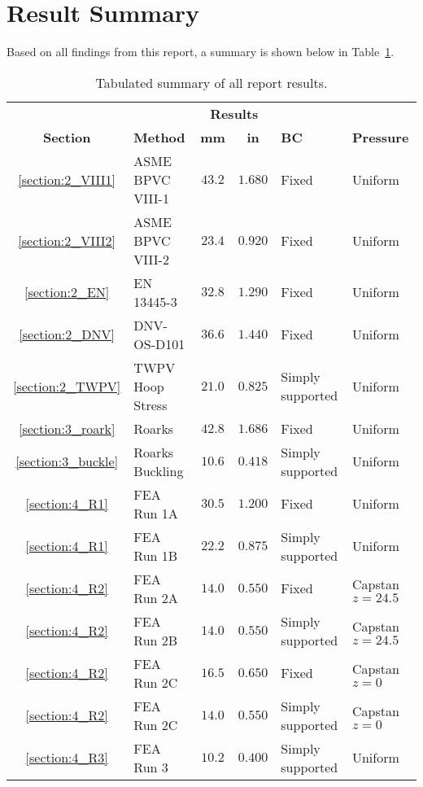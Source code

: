 \section{Result Summary}

Based on all findings from this report, a summary is shown below in Table~\ref{table:5_sum}.

\begin{table}[H]
  \centering
  \caption{Tabulated summary of all report results.}
    \begin{tabular}{clccll}
          &       & \multicolumn{2}{c}{\textbf{Results}} &       &  \\
    \textbf{Section} & \textbf{Method} & \textbf{mm} & \textbf{in} & \textbf{BC} & \textbf{Pressure } \\
    \midrule
          \ref{section:2_VIII1}& ASME BPVC VIII-1 & $43.2$ & $1.680$ & Fixed & Uniform \\
          \ref{section:2_VIII2}& ASME BPVC VIII-2 & $23.4$ & $0.920$ & Fixed & Uniform \\
          \ref{section:2_EN}& EN 13445-3 & $32.8$ & $1.290$ & Fixed & Uniform \\
          \ref{section:2_DNV}& DNV-OS-D101 & $36.6$ & $1.440$ & Fixed & Uniform \\
          \ref{section:2_TWPV}& TWPV Hoop Stress & $21.0$ & $0.825$ & Simply supported & Uniform \\
          \ref{section:3_roark}& Roarks & $42.8$ & $1.686$ & Fixed & Uniform \\
          \ref{section:3_buckle}& Roarks Buckling & $10.6$ & $0.418$ & Simply supported & Uniform \\
          \ref{section:4_R1}& FEA Run 1A & $30.5$ & $1.200$ & Fixed & Uniform \\
          \ref{section:4_R1}& FEA Run 1B & $22.2$ & $0.875$ & Simply supported & Uniform \\
          \ref{section:4_R2}& FEA Run 2A & $14.0$ & $0.550$ & Fixed & Capstan $z=24.5$ \\
          \ref{section:4_R2}& FEA Run 2B & $14.0$ & $0.550$ & Simply supported & Capstan $z=24.5$\\
          \ref{section:4_R2}& FEA Run 2C & $16.5$ & $0.650$ & Fixed & Capstan $z=0$ \\
          \ref{section:4_R2}& FEA Run 2C & $14.0$ & $0.550$ & Simply supported & Capstan $z=0$  \\
          \ref{section:4_R3}& FEA Run 3 & $10.2$ & $0.400$ & Simply supported & Uniform \\
    \end{tabular}
  \label{table:5_sum}
\end{table}%

